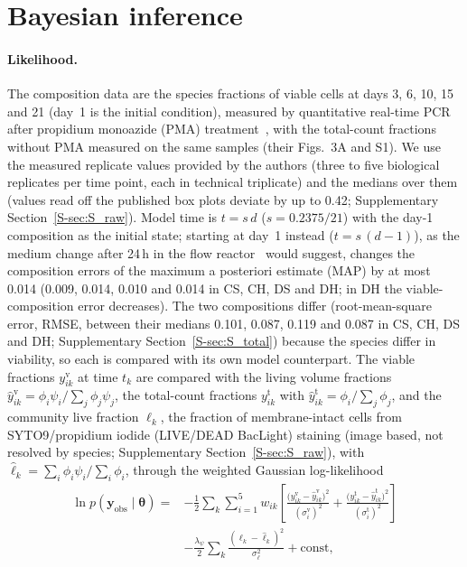 \documentclass[preprint,12pt]{elsarticle}
\newcommand{\btheta}{\boldsymbol{\theta}}
\newcommand{\yobs}{\mathbf{y}_{\mathrm{obs}}}
\begin{document}
\section{Bayesian inference}
\label{sec:inference}

\paragraph{Likelihood.}
The composition data are the species fractions of viable cells at days 3, 6, 10, 15 and 21 (day~1 is the initial condition), measured by quantitative real-time PCR after propidium monoazide (PMA) treatment~\citep{heine2025influence}, with the total-count fractions without PMA measured on the same samples (their Figs.~3A and S1).
We use the measured replicate values provided by the authors (three to five biological replicates per time point, each in technical triplicate) and the medians over them (values read off the published box plots deviate by up to 0.42; Supplementary Section~\ref{S-sec:S_raw}).
Model time is $t=s\,d$ ($s=0.2375/21$) with the day-1 composition as the initial state; starting at day~1 instead ($t=s\,(d-1)$), as the medium change after 24\,h in the flow reactor~\citep{heine2025influence} would suggest, changes the composition errors of the maximum a posteriori estimate (MAP) by at most 0.014 (0.009, 0.014, 0.010 and 0.014 in CS, CH, DS and DH; in DH the viable-composition error decreases).
The two compositions differ (root-mean-square error, RMSE, between their medians 0.101, 0.087, 0.119 and 0.087 in CS, CH, DS and DH; Supplementary Section~\ref{S-sec:S_total}) because the species differ in viability, so each is compared with its own model counterpart.
The viable fractions $y^{\mathrm{v}}_{ik}$ at time $t_k$ are compared with the living volume fractions $\hat y^{\mathrm{v}}_{ik}=\phi_i\psi_i/\sum_j\phi_j\psi_j$, the total-count fractions $y^{\mathrm{t}}_{ik}$ with $\hat y^{\mathrm{t}}_{ik}=\phi_i/\sum_j\phi_j$, and the community live fraction $\ell_k$, the fraction of membrane-intact cells from SYTO9/propidium iodide (LIVE/DEAD BacLight) staining (image based, not resolved by species; Supplementary Section~\ref{S-sec:S_raw}), with $\hat\ell_k=\sum_i\phi_i\psi_i/\sum_i\phi_i$, through the weighted Gaussian log-likelihood
\begin{equation}
\begin{split}
\ln p(\yobs\mid\btheta)={}&-\frac12\sum_{k}\sum_{i=1}^{5}w_{ik}\left[\frac{\bigl(y^{\mathrm{v}}_{ik}-\hat y^{\mathrm{v}}_{ik}\bigr)^2}{(\sigma^{\mathrm{v}}_{i})^2}+\frac{\bigl(y^{\mathrm{t}}_{ik}-\hat y^{\mathrm{t}}_{ik}\bigr)^2}{(\sigma^{\mathrm{t}}_{i})^2}\right]\\
&-\frac{\lambda_\psi}{2}\sum_k\frac{(\ell_k-\hat\ell_k)^2}{\sigma_\ell^2}+\mathrm{const},
\end{split}
\label{eq:lik}
\end{equation}
\end{document}
